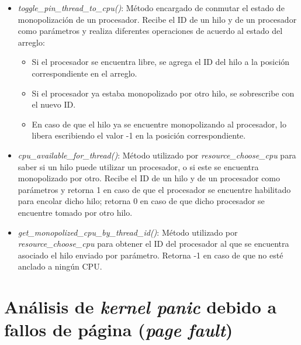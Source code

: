 \begin{itemize}
    \item \textit{toggle\_pin\_thread\_to\_cpu()}: Método encargado de conmutar el estado de monopolización de un procesador. Recibe el ID de un hilo y de un procesador como parámetros y realiza diferentes operaciones de acuerdo al estado del arreglo:
          \begin{itemize}
              \item Si el procesador se encuentra libre, se agrega el ID del hilo a la posición correspondiente en el arreglo.
              \item Si el procesador ya estaba monopolizado por otro hilo, se sobrescribe con el nuevo ID.
              \item En caso de que el hilo ya se encuentre monopolizando al procesador, lo libera escribiendo el valor -1 en la posición correspondiente.
          \end{itemize}
    \item \textit{cpu\_available\_for\_thread()}: Método utilizado por \textit{resource\_choose\_cpu} para saber si un hilo puede utilizar un procesador, o si este se encuentra monopolizado por otro. Recibe el ID de un hilo y de un procesador como parámetros y retorna 1 en caso de que el procesador se encuentre habilitado para encolar dicho hilo; retorna 0 en caso de que dicho procesador se encuentre tomado por otro hilo.
    \item \textit{get\_monopolized\_cpu\_by\_thread\_id()}: Método utilizado por \textit{resource\_choose\_cpu} para obtener el ID del procesador al que se encuentra asociado el hilo enviado por parámetro. Retorna -1 en caso de que no esté anclado a ningún CPU.\par
\end{itemize}

\section{Análisis de \textit{kernel panic} debido a fallos de página (\textit{page fault})}\label{appendix:apC}


